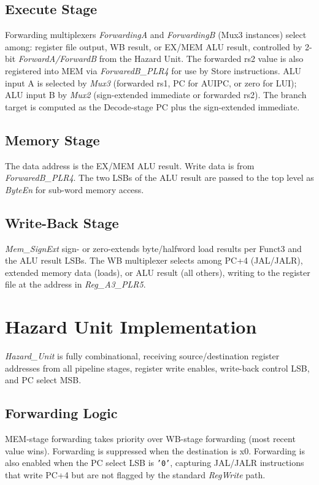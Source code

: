\subsection{Execute Stage}
Forwarding multiplexers \textit{ForwardingA} and \textit{ForwardingB} (Mux3 instances) select among: register file output, WB result, or EX/MEM ALU result, controlled by 2-bit \textit{ForwardA/ForwardB} from the Hazard Unit. The forwarded rs2 value is also registered into MEM via \textit{ForwaredB\_PLR4} for use by Store instructions. ALU input A is selected by \textit{Mux3} (forwarded rs1, PC for AUIPC, or zero for LUI); ALU input B by \textit{Mux2} (sign-extended immediate or forwarded rs2). The branch target is computed as the Decode-stage PC plus the sign-extended immediate.

\subsection{Memory Stage}
The data address is the EX/MEM ALU result. Write data is from \textit{ForwaredB\_PLR4}. The two LSBs of the ALU result are passed to the top level as \textit{ByteEn} for sub-word memory access.

\subsection{Write-Back Stage}
\textit{Mem\_SignExt} sign- or zero-extends byte/halfword load results per Funct3 and the ALU result LSBs. The WB multiplexer selects among PC+4 (JAL/JALR), extended memory data (loads), or ALU result (all others), writing to the register file at the address in \textit{Reg\_A3\_PLR5}.

\section{Hazard Unit Implementation}
\textit{Hazard\_Unit} is fully combinational, receiving source/destination register addresses from all pipeline stages, register write enables, write-back control LSB, and PC select MSB.

\subsection{Forwarding Logic}
MEM-stage forwarding takes priority over WB-stage forwarding (most recent value wins). Forwarding is suppressed when the destination is x0. Forwarding is also enabled when the PC select LSB is \texttt{'0'}, capturing JAL/JALR instructions that write PC+4 but are not flagged by the standard \textit{RegWrite} path.


